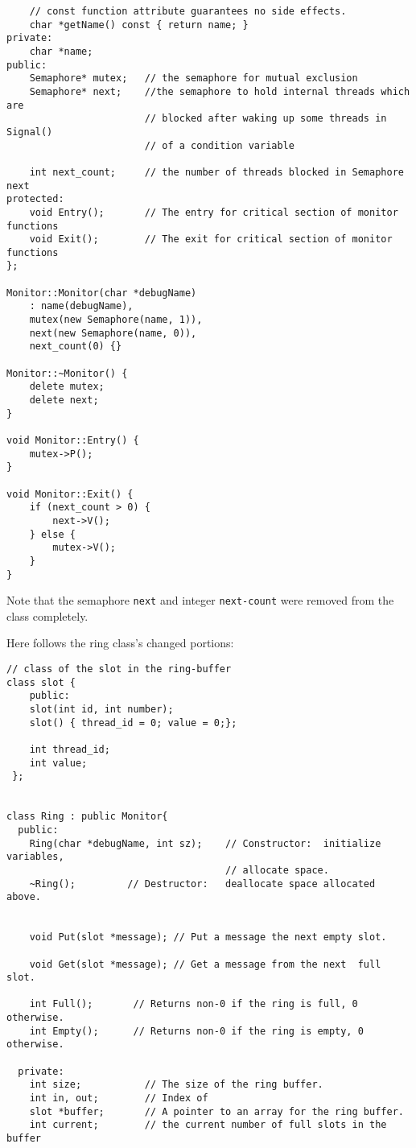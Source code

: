 \documentclass[11pt]{article}
\begin{document}
\begin{question}
\begin{verbatim}
    // const function attribute guarantees no side effects.
    char *getName() const { return name; }
private:
    char *name;
public:
    Semaphore* mutex;   // the semaphore for mutual exclusion
    Semaphore* next;    //the semaphore to hold internal threads which are
                        // blocked after waking up some threads in Signal()
                        // of a condition variable

    int next_count;     // the number of threads blocked in Semaphore next
protected:
    void Entry();       // The entry for critical section of monitor functions
    void Exit();        // The exit for critical section of monitor functions
};

Monitor::Monitor(char *debugName)
    : name(debugName),
    mutex(new Semaphore(name, 1)),
    next(new Semaphore(name, 0)),
    next_count(0) {}

Monitor::~Monitor() {
    delete mutex;
    delete next;
}

void Monitor::Entry() {
    mutex->P();
}

void Monitor::Exit() {
    if (next_count > 0) {
        next->V();
    } else {
        mutex->V();
    }
}
    \end{verbatim}

    Note that the semaphore {\tt next} and integer {\tt next-count} were removed from the class completely.

    Here follows the ring class's changed portions:

    \begin{verbatim}
// class of the slot in the ring-buffer
class slot {
    public:
    slot(int id, int number);
    slot() { thread_id = 0; value = 0;};

    int thread_id;
    int value;
 };


class Ring : public Monitor{
  public:
    Ring(char *debugName, int sz);    // Constructor:  initialize variables,
                                      // allocate space.
    ~Ring();         // Destructor:   deallocate space allocated above.


    void Put(slot *message); // Put a message the next empty slot.

    void Get(slot *message); // Get a message from the next  full slot.

    int Full();       // Returns non-0 if the ring is full, 0 otherwise.
    int Empty();      // Returns non-0 if the ring is empty, 0 otherwise.

  private:
    int size;           // The size of the ring buffer.
    int in, out;        // Index of
    slot *buffer;       // A pointer to an array for the ring buffer.
    int current;        // the current number of full slots in the buffer


\end{verbatim}
\end{question}
\end{document}
